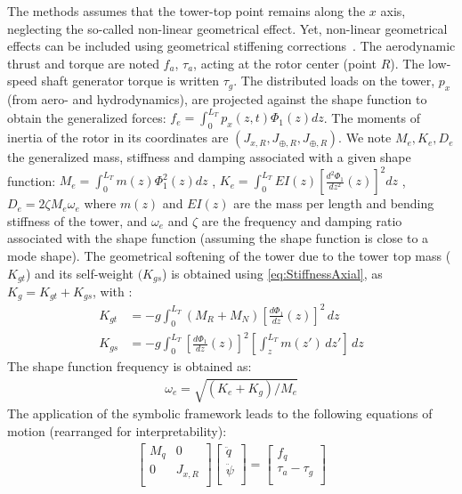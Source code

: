 \documentclass[wes, manuscript]{copernicus}
\begin{document}
The methods assumes that the tower-top point remains along the $x$ axis, neglecting the so-called non-linear geometrical effect. Yet, non-linear geometrical effects can be included using geometrical stiffening corrections~\citep{branlard:2019flex}.
The aerodynamic thrust and torque are noted $f_a$, $\tau_a$, acting at the rotor center (point $R$). The low-speed shaft generator torque is written $\tau_g$. The distributed loads on the tower, $p_x$ (from aero- and hydrodynamics), are projected against the shape function to obtain the generalized forces: 
  $f_e=\int_0^{L_T} p_x(z,t)\Phi_1(z) dz $.
The moments of inertia of the rotor in its coordinates are $(J_{x,R}, J_{\oplus,R}, J_{\oplus,R})$. We note $M_e, K_e, D_e$  the generalized mass, stiffness and damping associated with a given shape function:
$M_e=\int_0^{L_T} m(z) \Phi_1^2(z) dz$
    ,
  $K_e=\int_0^{L_T} EI(z) \left[\frac{d^2\Phi_1}{dz^2}(z)\right]^2 dz$
,
    $D_e= 2 \zeta M_e \omega_e$
where $m(z)$ and $EI(z)$ are the mass per length and bending stiffness of the tower, and $\omega_e$  and $\zeta$ are the frequency and damping ratio associated with the shape function (assuming the shape function is close to a mode shape).
The geometrical softening of the tower due to the tower top mass ($K_{gt}$) and its self-weight $(K_{gs}$) is obtained using \autoref{eq:StiffnessAxial}, as $K_g= K_{gt}+K_{gs}$, with :
\begin{align}
  K_{gt}&=- g \int_0^{L_T} (M_{R}+M_N)\left[\frac{d\Phi_1}{dz}(z)\right]^2\, dz
     \\
  K_{gs}&=- g \int_0^{L_T} \left[\frac{d\Phi_1}{dz}(z)\right]^2 \left[\int_z^{L_T} m(z')\,dz' \right]  \, dz
\end{align}
The shape function frequency is obtained as:
\begin{align}
    \omega_e = \sqrt{(K_e+K_g)/M_e}
\end{align}
The application of the symbolic framework leads to the following equations of motion (rearranged for interpretability):
\begin{align}
    \begin{bmatrix}
    M_q & 0 \\ 
    0 & J_{x,R} \\ 
    \end{bmatrix}
    \begin{bmatrix}
    \ddot{q}\\
    \ddot{\psi}\\
    \end{bmatrix}
    =
    \begin{bmatrix}
    f_q \\
    \tau_a-\tau_g\\
    \end{bmatrix}
    \label{eq:EOM2DOF}
\end{align}
\end{document}
